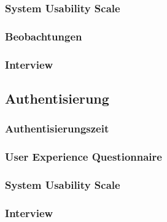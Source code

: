 \documentclass[doktyp=marbeit, twoside]{TUBAFarbeiten}
\begin{document}
        \subsubsection{System Usability Scale}
            \label{sec: ergebnisse studie sus}
            

        \subsubsection{Beobachtungen}
            \label{sec: ergebnisse studie beobachtungen}
            

        \subsubsection{Interview}
            \label{sec: ergebnisse studie interview}
            

    \subsection{Authentisierung}
        \label{sec: ergebnisse studie authentisierung}
        

        \subsubsection{Authentisierungszeit}
            \label{sec: ergebnisse studie auth time}
            

        \subsubsection{User Experience Questionnaire}
            \label{sec: ergebnisse studie auth ueq}
            
        
        \subsubsection{System Usability Scale}
            \label{sec: ergebnisse studie auth sus}
            

        \subsubsection{Interview}
            \label{sec: ergebnisse studie auth interview}
            
    
\end{document}
